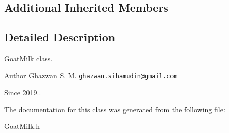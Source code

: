 \subsection*{Additional Inherited Members}


\subsection{Detailed Description}
\hyperlink{classGoatMilk}{Goat\+Milk} class.

\begin{DoxyAuthor}{Author}
Ghazwan S. M. \href{mailto:ghazwan.sihamudin@gmail.com}{\tt ghazwan.\+sihamudin@gmail.\+com} 
\end{DoxyAuthor}
\begin{DoxySince}{Since}
2019.. 
\end{DoxySince}


The documentation for this class was generated from the following file\+:\begin{DoxyCompactItemize}
\item 
Goat\+Milk.\+h\end{DoxyCompactItemize}
